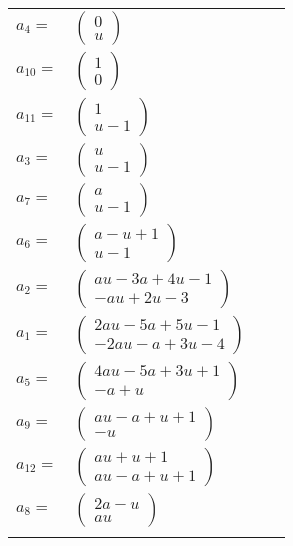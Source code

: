 \documentclass[1p]{elsarticle_modified}
\theoremstyle{definition}
\begin{document}
\begin{tabular}{m{7pt} m{180pt} m{7pt} m{180pt} }
\flushright $a_{4}=$&$\begin{pmatrix}0\\u\end{pmatrix}$ \\
\flushright $a_{10}=$&$\begin{pmatrix}1\\0\end{pmatrix}$ \\
\flushright $a_{11}=$&$\begin{pmatrix}1\\u-1\end{pmatrix}$ \\
\flushright $a_{3}=$&$\begin{pmatrix}u\\u-1\end{pmatrix}$ \\
\flushright $a_{7}=$&$\begin{pmatrix}a\\u-1\end{pmatrix}$ \\
\flushright $a_{6}=$&$\begin{pmatrix}a- u+1\\u-1\end{pmatrix}$ \\
\flushright $a_{2}=$&$\begin{pmatrix}a u-3 a+4 u-1\\- a u+2 u-3\end{pmatrix}$ \\
\flushright $a_{1}=$&$\begin{pmatrix}2 a u-5 a+5 u-1\\-2 a u- a+3 u-4\end{pmatrix}$ \\
\flushright $a_{5}=$&$\begin{pmatrix}4 a u-5 a+3 u+1\\- a+u\end{pmatrix}$ \\
\flushright $a_{9}=$&$\begin{pmatrix}a u- a+u+1\\- u\end{pmatrix}$ \\
\flushright $a_{12}=$&$\begin{pmatrix}a u+u+1\\a u- a+u+1\end{pmatrix}$ \\
\flushright $a_{8}=$&$\begin{pmatrix}2 a- u\\a u\end{pmatrix}$\\&\end{tabular}
\end{document}
